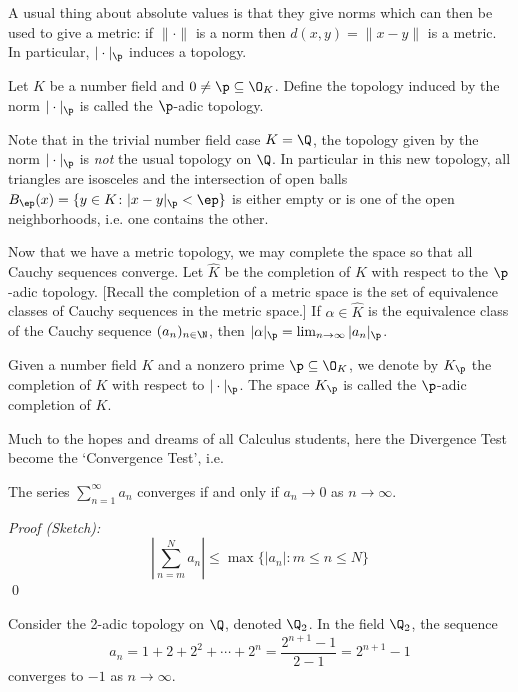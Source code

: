 A usual thing about absolute values is that they give norms which can then be used to give a metric: if $\| \cdot\|$ is a norm then $d(x,y)=\|x-y\|$ is a metric. In particular, $|\cdot|_\p$ induces a topology.

\begin{dfn}
Let $K$ be a number field and $0 \neq \p \subseteq \O_K$. Define the topology induced by the norm $|\cdot|_\p$ is called the $\p$-adic topology. 
\end{dfn}

\begin{rem}
Note that in the trivial number field case $K=\Q$, the topology given by the norm $|\cdot|_\p$ is \emph{not} the usual topology on $\Q$. In particular in this new topology, all triangles are isosceles and the intersection of open balls $B_\ep(x)=\{y \in K \colon |x-y|_\p<\ep \}$ is either empty or is one of the open neighborhoods, i.e. one contains the other. 
\end{rem}

Now that we have a metric topology, we may complete the space so that all Cauchy sequences converge. Let $\widehat{K}$ be the completion of $K$ with respect to the $\p$-adic topology. [Recall the completion of a metric space is the set of equivalence classes of Cauchy sequences in the metric space.] If $\alpha \in \widehat{K}$ is the equivalence class of the Cauchy sequence $(a_n)_{n \in \N}$, then $|\alpha|_\p = \lim_{n \to \infty} |a_n|_\p$. 

\begin{dfn}
Given a number field $K$ and a nonzero prime $\p \subseteq \O_K$, we denote by $K_\p$ the completion of $K$ with respect to $|\cdot|_\p$. The space $K_\p$ is called the $\p$-adic completion of $K$.
\end{dfn}

Much to the hopes and dreams of all Calculus students, here the Divergence Test become the `Convergence Test', i.e.


\begin{prop}
The series $\displaystyle\sum_{n=1}^\infty a_n$ converges if and only if $a_n \to 0$ as $n \to \infty$.
\end{prop}

\noindent \emph{Proof (Sketch): }
	\[
	\left| \sum_{n=m}^N a_n \right| \leq \max\{ |a_n| \colon m \leq n \leq N \}
	\]
\qed \\


\begin{ex}
Consider the 2-adic topology on $\Q$, denoted $\Q_2$. In the field $\Q_2$, the sequence
	\[
	a_n= 1+2 + 2^2 + \cdots + 2^n = \dfrac{2^{n+1} -1}{2-1}= 2^{n+1}-1
	\]
converges to $-1$ as $n \to \infty$. \xqed
\end{ex}


